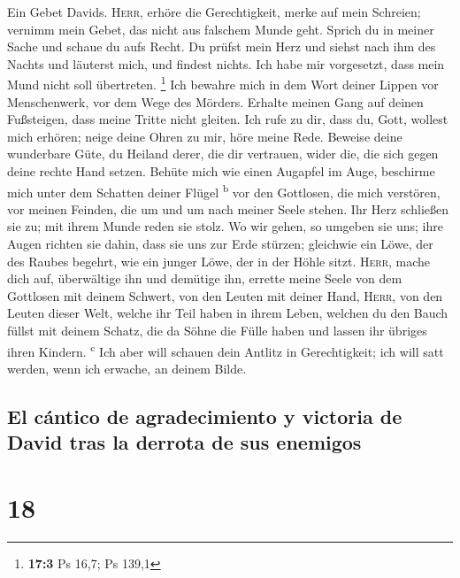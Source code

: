  Ein Gebet Davids. \textsc{Herr}, erhöre die
Gerechtigkeit, merke auf mein Schreien; vernimm mein Gebet, das nicht
aus falschem Munde geht.  Sprich du in meiner Sache und
schaue du aufs Recht.  Du prüfst mein Herz und siehst nach
ihm des Nachts und läuterst mich, und findest nichts. Ich habe mir
vorgesetzt, dass mein Mund nicht soll übertreten. \footnote{\textbf{17:3}
  Ps 16,7; Ps 139,1}  Ich bewahre mich in dem Wort deiner
Lippen vor Menschenwerk, vor dem Wege des Mörders. 
Erhalte meinen Gang auf deinen Fußsteigen, dass meine Tritte nicht
gleiten.  Ich rufe zu dir, dass du, Gott, wollest mich
erhören; neige deine Ohren zu mir, höre meine Rede. 
Beweise deine wunderbare Güte, du Heiland derer, die dir vertrauen,
wider die, die sich gegen deine rechte Hand setzen. 
Behüte mich wie einen Augapfel im Auge, beschirme mich unter dem
Schatten deiner Flügel \textsuperscript{b}  vor den
Gottlosen, die mich verstören, vor meinen Feinden, die um und um nach
meiner Seele stehen.  Ihr Herz schließen sie zu; mit
ihrem Munde reden sie stolz.  Wo wir gehen, so umgeben
sie uns; ihre Augen richten sie dahin, dass sie uns zur Erde stürzen;
 gleichwie ein Löwe, der des Raubes begehrt, wie ein
junger Löwe, der in der Höhle sitzt.  \textsc{Herr},
mache dich auf, überwältige ihn und demütige ihn, errette meine Seele
von dem Gottlosen mit deinem Schwert,  von den Leuten mit
deiner Hand, \textsc{Herr}, von den Leuten dieser Welt, welche ihr Teil
haben in ihrem Leben, welchen du den Bauch füllst mit deinem Schatz, die
da Söhne die Fülle haben und lassen ihr übriges ihren Kindern.
\textsuperscript{c}  Ich aber will schauen dein Antlitz
in Gerechtigkeit; ich will satt werden, wenn ich erwache, an deinem
Bilde.

\hypertarget{el-cuxe1ntico-de-agradecimiento-y-victoria-de-david-tras-la-derrota-de-sus-enemigos}{%
\subsection{El cántico de agradecimiento y victoria de David tras la
derrota de sus
enemigos}\label{el-cuxe1ntico-de-agradecimiento-y-victoria-de-david-tras-la-derrota-de-sus-enemigos}}

\hypertarget{section-17}{%
\section{18}\label{section-17}}

